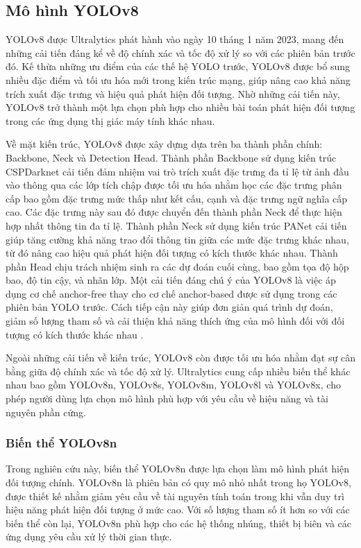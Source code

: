 \subsection{Mô hình YOLOv8}

YOLOv8 được Ultralytics phát hành vào ngày 10 tháng 1 năm 2023, mang đến những
cải tiến đáng kể về độ chính xác và tốc độ xử lý so với các phiên bản trước
đó. Kế thừa những ưu điểm của các thế hệ YOLO trước, YOLOv8 được bổ sung nhiều
đặc điểm và tối ưu hóa mới trong kiến trúc mạng, giúp nâng cao khả năng trích
xuất đặc trưng và hiệu quả phát hiện đối tượng. Nhờ những cải tiến này, YOLOv8
trở thành một lựa chọn phù hợp cho nhiều bài toán phát hiện đối tượng trong
các ứng dụng thị giác máy tính khác nhau.

Về mặt kiến trúc, YOLOv8 được xây dựng dựa trên ba thành phần chính: Backbone,
Neck và Detection Head. Thành phần Backbone sử dụng kiến trúc CSPDarknet cải
tiến đảm nhiệm vai trò trích xuất đặc trưng đa tỉ lệ từ ảnh đầu vào thông
qua các lớp tích chập được tối ưu hóa nhằm học các đặc trưng phân cấp bao gồm
đặc trưng mức thấp như kết cấu, cạnh và đặc trưng ngữ nghĩa cấp cao. Các đặc
trưng này sau đó được chuyển đến thành phần Neck để thực hiện hợp nhất thông
tin đa tỉ lệ. Thành phần Neck sử dụng kiến trúc PANet cải tiến giúp tăng cường
khả năng trao đổi thông tin giữa các mức đặc trưng khác nhau, từ đó nâng cao
hiệu quả phát hiện đối tượng có kích thước khác nhau. Thành phần Head chịu
trách nhiệm sinh ra các dự đoán cuối cùng, bao gồm tọa độ hộp bao, độ tin cậy,
và nhãn lớp. Một cải tiến đáng chú ý của YOLOv8 là việc áp dụng cơ chế
anchor-free thay cho cơ chế anchor-based được sử dụng trong các phiên bản
YOLO trước. Cách tiếp cận này giúp đơn giản quá trình dự đoán, giảm số lượng
tham số và cải thiện khả năng thích ứng của mô hình đối với đối tượng có kích
thước khác nhau \cite{yaseen2024yolov8}.

Ngoài những cải tiến về kiến trúc, YOLOv8 còn được tối ưu hóa nhằm đạt sự cân
bằng giữa độ chính xác và tốc độ xử lý. Ultralytics cung cấp nhiều biến thể
khác nhau bao gồm YOLOv8n, YOLOv8s, YOLOv8m, YOLOv8l và YOLOv8x, cho phép
người dùng lựa chọn mô hình phù hợp với yêu cầu về hiệu năng và tài nguyên
phần cứng.

\subsubsection{Biến thể YOLOv8n}

Trong nghiên cứu này, biến thể YOLOv8n được lựa chọn làm mô hình phát hiện đối
tượng chính. YOLOv8n là phiên bản có quy mô nhỏ nhất trong họ YOLOv8, được
thiết kế nhằm giảm yêu cầu về tài nguyên tính toán trong khi vẫn duy trì hiệu
năng phát hiện đối tượng ở mức cao. Với số lượng tham số ít hơn so với các
biến thể còn lại, YOLOv8n phù hợp cho các hệ thống nhúng, thiết bị biên và các
ứng dụng yêu cầu xử lý thời gian thực.


